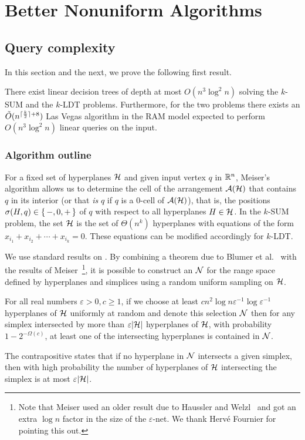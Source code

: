 \section{Better Nonuniform Algorithms}

\subsection{Query complexity}
\label{sec:query-complexity}

In this section and the next, we prove the following first result.
\begin{theorem}
\label{thm:cube}
There exist linear decision trees of depth at most \(O(n^3\log^2 n)\) solving
the \(k\)-SUM and the \(k\)-LDT problems. Furthermore, for the two problems there
exists an $\tilde{O}(n^{\lceil\frac{k}{2}\rceil+8})$ Las Vegas algorithm in
the RAM model expected to perform $O(n^3\log^2 n)$ linear queries on the input.
\end{theorem}

\subsubsection{Algorithm outline}
For a fixed set of hyperplanes \(\mathcal{H}\) and given input vertex \(q\) in \(\mathbb{R}^n\),
Meiser's algorithm allows us to determine the cell of the arrangement
$\mathcal{A}(\mathcal{H})$ that contains $q$ in its interior (or that \emph{is} $q$ if
$q$ is a $0$-cell of $\mathcal{A}(\mathcal{H})$), that is, the positions $\sigma(H,q) \in
\left\{\,{-, 0, +}\,\right\}$ of \(q\) with respect to all hyperplanes $H \in \mathcal{H}$. In the \(k\)-SUM
problem, the set $\mathcal{H}$ is the set of $\Theta(n^k)$ hyperplanes with equations of the
form $x_{i_1} + x_{i_2} + \cdots + x_{i_k} = 0$. 
These equations can be modified accordingly for \(k\)-LDT.

We use standard results on \enets{}. By combining a theorem due to Blumer et
al.~\cite{BEHW89} with the results of Meiser~\cite{M93}\footnote{Note that
Meiser used an older result due to Haussler and Welzl~\cite{H87} and got an
extra $\log n$ factor in the size of the $\varepsilon$-net. We thank Hervé
Fournier for pointing this out.}, it is possible to
construct an \enet{} \(\mathcal{N}\) for the range space
defined by hyperplanes and simplices using a random uniform sampling on \(\mathcal{H}\).
\begin{theorem}\label{thm:enet}
	For all real numbers $\varepsilon > 0, c \ge 1$,
	if we choose at least \(c n^2 \log n \varepsilon^{-1} \log
	\varepsilon^{-1} \) hyperplanes of \(\mathcal{H}\) uniformly at
random and denote this selection \(\mathcal{N}\) then for
any simplex intersected by more than \(\varepsilon |{\mathcal{H}}|\) hyperplanes of
\(\mathcal{H}\), with probability $1 - 2^{-\Omega(c)}$, at least one of the intersecting hyperplanes
is contained in \(\mathcal{N}\).
\end{theorem}
The contrapositive states that if no hyperplane in \(\mathcal{N}\) intersects
a given simplex, then with high probability the number of hyperplanes of
\(\mathcal{H}\) intersecting the simplex is at most \(\varepsilon |{\mathcal{H}}|\).

